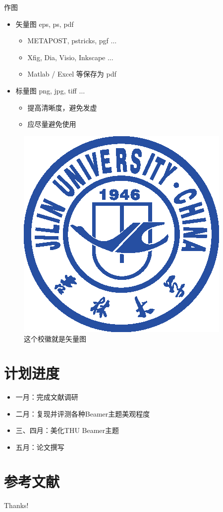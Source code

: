 \documentclass{beamer}
\begin{document}
	\begin{frame}{作图}
		\begin{itemize}
			\item 矢量图 eps, ps, pdf
			\begin{itemize}
				\item METAPOST, pstricks, pgf $\ldots$
				\item Xfig, Dia, Visio, Inkscape $\ldots$
				\item Matlab / Excel 等保存为 pdf
			\end{itemize}
			\item 标量图 png, jpg, tiff $\ldots$
			\begin{itemize}
				\item 提高清晰度，避免发虚
				\item 应尽量避免使用
			\end{itemize}
		\end{itemize}
		\begin{figure}[htpb]
			\centering
			\includegraphics[width=0.2\linewidth]{pic/jlu_logo.eps}
			\caption{这个校徽就是矢量图}
		\end{figure}
	\end{frame}
	
	
	\section{计划进度}
	\begin{frame}
		\begin{itemize}
			\item 一月：完成文献调研
			\item 二月：复现并评测各种Beamer主题美观程度
			\item 三、四月：美化THU Beamer主题
			\item 五月：论文撰写
		\end{itemize}
	\end{frame}
	
	
	\section{参考文献}
	
	\begin{frame}[allowframebreaks]
		
		
	\end{frame}
	
	\begin{frame}
		\begin{center}
			{\Huge\calligra Thanks!}
		\end{center}
	\end{frame}
	
\end{document}
